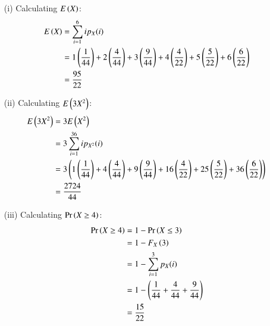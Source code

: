 \documentclass[journal,24pt,onecolumn]{IEEEtran}
\theoremstyle{remark}
\begin{document}
\begin{enumerate}
    \item[(i)] Calculating $E\left(X\right)$:
    \begin{align}
        E\left(X\right) 
        &= \sum_{i = 1}^{6} ip_X(i)\\
        &= 1\left(\frac{1}{44}\right) + 2\left(\frac{4}{44}\right) + 3\left(\frac{9}{44}\right) + 4\left(\frac{4}{22}\right) + 5\left(\frac{5}{22}\right) + 6\left(\frac{6}{22}\right)\\
        &= \frac{95}{22}
    \end{align}
    \item[(ii)] Calculating $E\left(3X^2\right)$:
    \begin{align}
        E\left(3X^2\right) &= 3E\left(X^2\right)\\
        &= 3\sum_{i = 1}^{36} ip_{X^2}(i)\\
        &= 3\left(1\left(\frac{1}{44}\right) + 4\left(\frac{4}{44}\right) + 9\left(\frac{9}{44}\right) + 16\left(\frac{4}{22}\right) + 25\left(\frac{5}{22}\right) + 36\left(\frac{6}{22}\right)\right)\\
        &= \frac{2724}{44}
    \end{align}
    \item[(iii)] Calculating $\Pr\left(X \geq 4\right)$:
    \begin{align}
        \Pr\left(X \geq 4\right) &= 1 - \Pr\left(X \leq 3\right)\\
        &= 1 - F_X\left(3\right)\\
        &= 1 - \sum_{i = 1}^{3} p_X(i)\\
        &= 1 - \left(\frac{1}{44} + \frac{4}{44} + \frac{9}{44}\right)\\
        &= \frac{15}{22}
    \end{align}
\end{enumerate}
\end{document}
